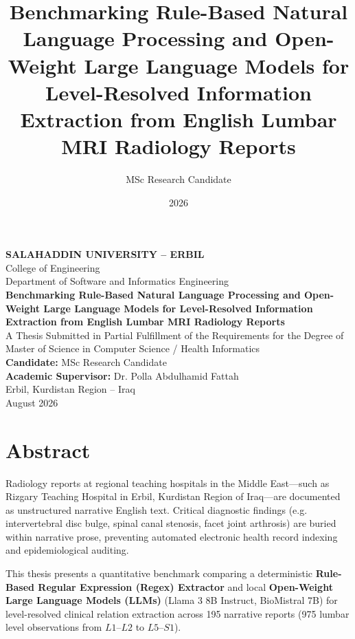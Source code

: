 \documentclass[12pt,a4paper,oneside]{report}
\title{\textbf{Benchmarking Rule-Based Natural Language Processing and Open-Weight Large Language Models for Level-Resolved Information Extraction from English Lumbar MRI Radiology Reports}}
\author{MSc Research Candidate}
\date{2026}
\begin{document}
\begin{titlepage}
    \centering
    \vspace*{1cm}
    
    {\Large \textbf{SALAHADDIN UNIVERSITY -- ERBIL}}\\[0.3cm]
    {\large College of Engineering}\\[0.2cm]
    {\large Department of Software and Informatics Engineering}\\[2cm]
    
    {\Large \textbf{Benchmarking Rule-Based Natural Language Processing and Open-Weight Large Language Models for Level-Resolved Information Extraction from English Lumbar MRI Radiology Reports}}\\[2cm]
    
    {\large A Thesis Submitted in Partial Fulfillment of the Requirements for the Degree of Master of Science in Computer Science / Health Informatics}\\[2cm]
    
    \textbf{Candidate:} MSc Research Candidate\\[0.5cm]
    \textbf{Academic Supervisor:} Dr. Polla Abdulhamid Fattah\\[2.5cm]
    
    {\large Erbil, Kurdistan Region -- Iraq}\\[0.5cm]
    {\large August 2026}
\end{titlepage}

\newpage
{}
\chapter*{Abstract}

Radiology reports at regional teaching hospitals in the Middle East---such as Rizgary Teaching Hospital in Erbil, Kurdistan Region of Iraq---are documented as unstructured narrative English text. Critical diagnostic findings (e.g. intervertebral disc bulge, spinal canal stenosis, facet joint arthrosis) are buried within narrative prose, preventing automated electronic health record indexing and epidemiological auditing.

This thesis presents a quantitative benchmark comparing a deterministic \textbf{Rule-Based Regular Expression (Regex) Extractor} and local \textbf{Open-Weight Large Language Models (LLMs)} (Llama 3 8B Instruct, BioMistral 7B) for level-resolved clinical relation extraction across 195 narrative reports (975 lumbar level observations from $L1$--$L2$ to $L5$--$S1$).
\end{document}
